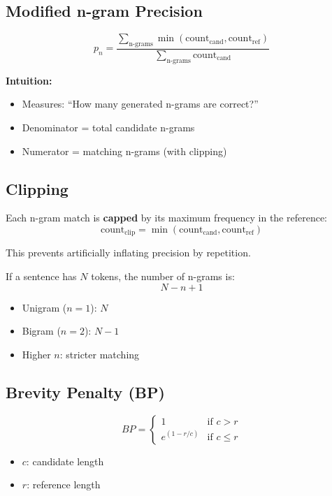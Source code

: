 \documentclass[10pt,a4paper]{article}
\begin{document}
\subsection{Modified n-gram Precision}

\[
p_n =
\frac{\sum\limits_{\text{n-grams}} \min(\text{count}_{\text{cand}}, \text{count}_{\text{ref}})}
{\sum\limits_{\text{n-grams}} \text{count}_{\text{cand}}}
\]

\textbf{Intuition:}
\begin{itemize}
    \item Measures: ``How many generated n-grams are correct?''
    \item Denominator = total candidate n-grams
    \item Numerator = matching n-grams (with clipping)
\end{itemize}

\subsection{Clipping}

Each n-gram match is \textbf{capped} by its maximum frequency in the reference:
\[
\text{count}_{\text{clip}} = \min(\text{count}_{\text{cand}}, \text{count}_{\text{ref}})
\]

This prevents artificially inflating precision by repetition.


If a sentence has $N$ tokens, the number of n-grams is:
\[
N - n + 1
\]

\begin{itemize}
    \item Unigram ($n=1$): $N$
    \item Bigram ($n=2$): $N-1$
    \item Higher $n$: stricter matching
\end{itemize}

\subsection{Brevity Penalty (BP)}

\[
BP =
\begin{cases}
1 & \text{if } c > r \\
e^{(1 - r/c)} & \text{if } c \le r
\end{cases}
\]

\begin{itemize}
    \item $c$: candidate length
    \item $r$: reference length
\end{itemize}
\end{document}
